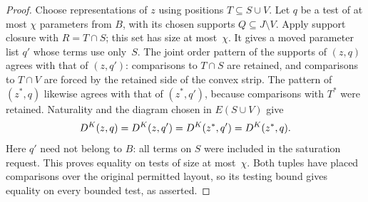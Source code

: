 \begin{proof}
Choose representations of $z$ using positions $T\subseteq S\cup
V$.  Let $q$ be a test of at most $\chi$ parameters from $B$, with
its chosen supports $Q\subseteq J\setminus V$.  Apply support
closure with $R=T\cap S$; this set has size at most~$\chi$.
It gives a moved parameter list $q'$ whose terms use only~$S$.
The joint order pattern of the supports of $(z,q)$ agrees with
that of $(z,q')$: comparisons to $T\cap S$ are retained, and
comparisons to $T\cap V$ are forced by the retained side of the
convex strip.  The pattern of $(z^*,q)$ likewise agrees with that
of $(z^*,q')$, because comparisons with $T^*$ were retained.
Naturality and the diagram chosen in $E(S\cup V)$ give
\[
 D^{K}(z,q)=D^{K}(z,q')
             =D^{K}(z^*,q')=D^{K}(z^*,q).
\]
Here $q'$ need not belong to $B$: all terms on $S$ were included
in the saturation request.  This proves equality on tests of
size at most~$\chi$.  Both tuples have placed comparisons over
the original permitted layout, so its testing bound gives equality
on every bounded test, as asserted.
\end{proof}

